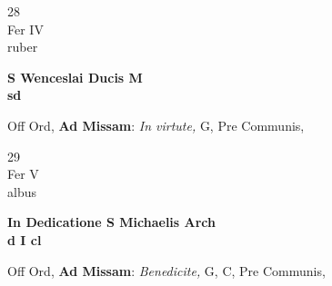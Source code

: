 \documentclass[10pt, openany]{book}
\begin{document}
        \begin{center}
            \begin{minipage}{3.5in}
                \vspace{2em}
                \begin{minipage}{0.5in}
                    {\Huge 28} \\
                    {\normalsize Fer IV} \\
                    {\normalsize ruber}
                \end{minipage}
                \begin{minipage}{3.0in}
                    \textbf{ \large S Wenceslai Ducis M \\
                    \textnormal{\normalsize sd}} \\ 
                \end{minipage}
                \begin{justify}Off Ord, \textbf{Ad Missam}: \textit{In virtute,} G, Pre Communis,   
                \end{justify}
            \end{minipage}
        \end{center}
    
        \begin{center}
            \begin{minipage}{3.5in}
                \vspace{2em}
                \begin{minipage}{0.5in}
                    {\Huge 29} \\
                    {\normalsize Fer V} \\
                    {\normalsize albus}
                \end{minipage}
                \begin{minipage}{3.0in}
                    \textbf{ \large In Dedicatione S Michaelis Arch \\
                    \textnormal{\normalsize d I cl}} \\ 
                \end{minipage}
                \begin{justify}Off Ord, \textbf{Ad Missam}: \textit{Benedicite,} G, C, Pre Communis,   
                \end{justify}
            \end{minipage}
        \end{center}
    
\end{document}
